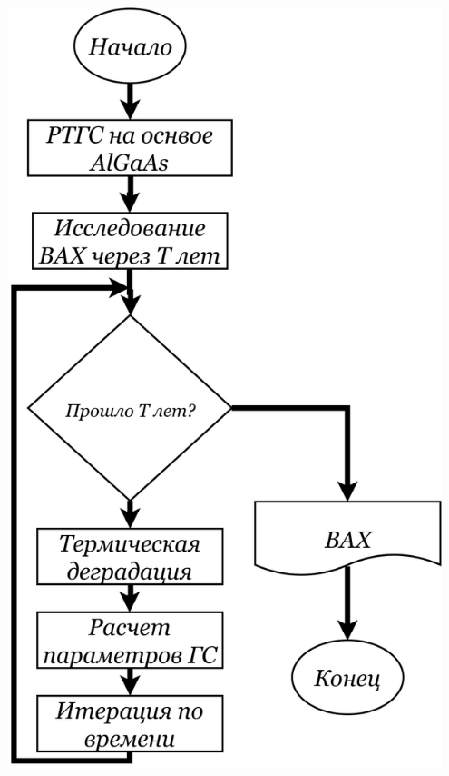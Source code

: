 \documentclass[10pt,pdf,hyperref={unicode},aspectratio={169}]{beamer}
\begin{document}
\begin{frame}
\begin{columns}
\begin{center}
			\includegraphics[width=0.95\textwidth]{assets/Cond}
		\end{center}
	\end{columns}
\end{frame}
\end{document}
